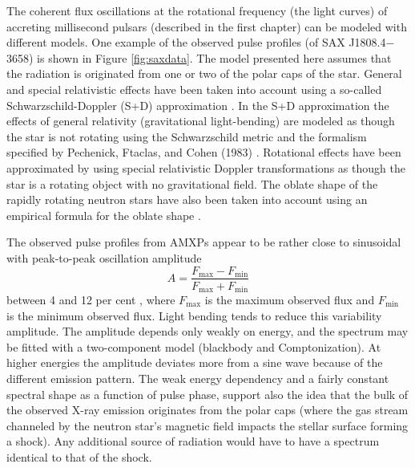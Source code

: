 \documentclass{wihuri}
\def\be{\begin{equation}}
\def\ee{\end{equation}}
\def\source{SAX J1808.4$-$3658}
\begin{document}
The coherent flux oscillations at the rotational frequency (the light curves) of accreting millisecond pulsars (described in the first chapter) can be modeled with different models. One example of the observed pulse profiles (of \source) is shown in Figure \ref{fig:saxdata}. The model presented here assumes that the radiation is originated from one or two of the polar caps of the star. General and special relativistic effects have been taken into account using a so-called Schwarzschild-Doppler (S+D) approximation %
\cite{millerlamb98}%
\cite{poutagierlinskisax}. In the S+D approximation the effects of general relativity (gravitational light-bending) are modeled as though the star is not rotating using the Schwarzschild metric and the formalism specified by
Pechenick, Ftaclas, and Cohen (1983) \cite{pechenick}. Rotational effects have been approximated by using special relativistic Doppler transformations as though the star is a rotating object with no gravitational field. The oblate shape of the rapidly rotating neutron stars have also been taken into account using an empirical formula for the oblate shape \cite{algendy} \cite{morsink}.


The observed pulse profiles from AMXPs appear to be rather close to sinusoidal with peak-to-peak oscillation amplitude 
\be \label{eq:amplitude}
A = \frac{F_{\mathrm{max}} - F_{\mathrm{min}}} {F_{\mathrm{max}} + F_{\mathrm{min}}}
\ee %
 between 4 and 12 per cent \cite{poutarew2006}, where $F_{\mathrm{max}}$ is the maximum observed flux and $F_{\mathrm{min}}$ is the minimum observed flux. Light bending tends %
to reduce this variability amplitude. The amplitude depends only weakly on energy, and the spectrum may be fitted with a two-component model (blackbody and Comptonization). At higher energies the amplitude deviates more from a sine wave because of the different emission pattern. The weak energy dependency and a fairly constant spectral shape as a function of pulse phase, support also the idea that the bulk of the observed X-ray emission originates from the polar caps (where the gas stream channeled by the neutron star's magnetic field impacts the stellar surface forming a shock). Any additional source of radiation would have to have a spectrum identical to that of the shock.
\end{document}
